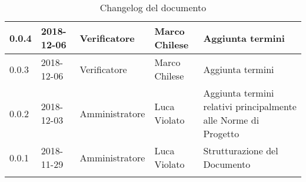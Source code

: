 \begin{center}
\begin{longtable}[c]{|m{}|m{}|m{}|m{}|p{}|}
\hline
\rowcolor{grigio}0.0.4 & 2018-12-06 & Verificatore & Marco Chilese & Aggiunta termini\\
\hline 
0.0.3 & 2018-12-06 & Verificatore  & Marco Chilese & Aggiunta termini\\
\hline
\rowcolor{grigio}0.0.2 & 2018-12-03 & Amministratore & Luca Violato & Aggiunta termini relativi principalmente alle Norme di Progetto \\
\hline
0.0.1 & 2018-11-29  & Amministratore & Luca Violato & Strutturazione del Documento \\
\hline
\caption{Changelog del documento}
\end{longtable}
\end{center}